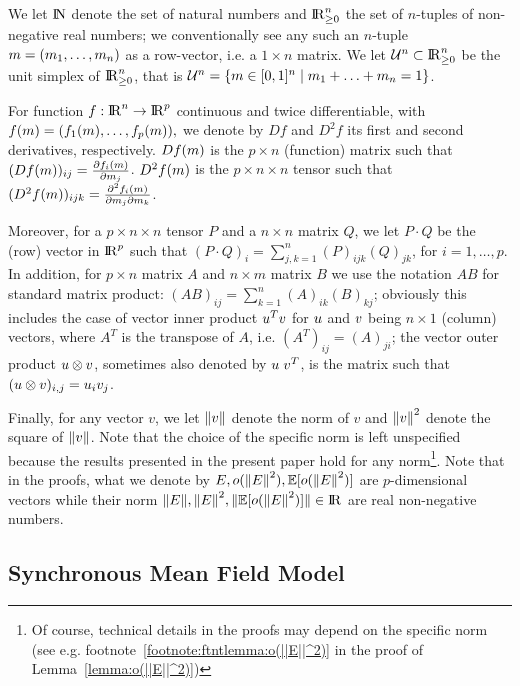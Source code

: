 \documentclass{amsart}
\begin{document}
We let $\mathrm{I\!N}$ denote the set of natural numbers and $\mathrm{I\!R}_{\geq 0}^n$ the
set of $n$-tuples of non-negative real numbers; we conventionally see
any such an $n$-tuple $m=(m_1,\ldots,m_n)$ as a row-vector,
i.e. a $1 \times n$ matrix. We let $\mathcal{U}^n \subset \mathrm{I\!R}_{\geq 0}^n$ be the
unit simplex of $\mathrm{I\!R}_{\geq 0}^n$, that is
$\mathcal{U}^n=\{m \in [0,1]^n \;|\; m_1 + \ldots +m_n =1\}$.

For function $f :\mathrm{I\!R}^n \rightarrow \mathrm{I\!R}^p$ continuous and twice
differentiable, with
$ f(m) = (f_1(m), \ldots, f_p(m)), $ we denote by $Df$
and $D^2f$ its first and second derivatives, respectively. $D f (m)$ is the
$p \times n$ (function) matrix such that
$(D f (m))_{ij} = \frac{\partial f_i(m)}{\partial m_j}$.
$D^2 f (m)$ is the $p \times n \times n$ tensor such that
$(D^2 f (m))_{ijk} = \frac{\partial^2 f_i(m)}{\partial
  m_j\partial m_k}$.

Moreover, for a $p \times n \times n$ tensor $P$ and a $n \times n$
matrix $Q$, we let $P \cdot Q$ be the (row) vector in $\mathrm{I\!R}^p$ such
that $(P \cdot Q)_i = \sum_{j,k=1}^n (P)_{ijk}(Q)_{jk}$, for
$i=1,\ldots, p$.  In addition, for $p \times n$ matrix $A$ and
$n \times m$ matrix $B$ we use the notation $AB$ for standard matrix
product: $(AB)_{ij} = \sum_{k=1}^n (A)_{ik}(B)_{kj}$; obviously this
includes the case of vector inner product $u^T v$ for
$u$ and $v$ being $n \times 1$ (column) vectors, where $A^T$
is the transpose of $A$, i.e. $(A^T)_{ij}=(A)_{ji}$; the vector outer
product $u \otimes v$, sometimes also denoted by
$u \;v^T$, is the matrix such that
$(u \otimes v)_{i,j} = u_iv_j$.

Finally, for any vector $v$, we let $\norm{v}$ denote the norm of $v$
and $\norm{v}^2$ denote the square of $\norm{v}$. Note that the choice
of the specific norm is left unspecified because the results presented
in the present paper hold for any norm\footnote{Of course, technical
  details in the proofs may depend on the specific norm (see
  e.g. footnote~\ref{footnote:ftntlemma:o(||E||^2)} in the proof of
  Lemma~\ref{lemma:o(||E||^2)})}.  Note that in the proofs, what we
denote by $E, o(\norm{E}^2), \esp{o(\norm{E}^2)}$ are $p$-dimensional
vectors while their norm
$\norm{E}, \norm{E}^2, \norm{\esp{o(\norm{E}^2)}} \in \reals$ are real
non-negative numbers.

\subsection{Synchronous Mean Field Model}
\end{document}
